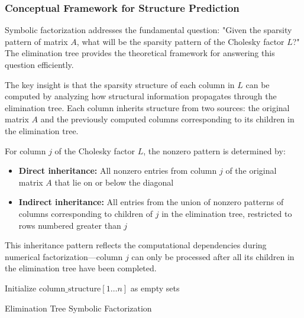 \subsubsection{Conceptual Framework for Structure Prediction}
Symbolic factorization addresses the fundamental question: "Given the sparsity pattern of matrix $A$, what will be the sparsity pattern of the Cholesky factor $L$?" The elimination tree provides the theoretical framework for answering this question efficiently.

The key insight is that the sparsity structure of each column in $L$ can be computed by analyzing how structural information propagates through the elimination tree. Each column inherits structure from two sources: the original matrix $A$ and the previously computed columns corresponding to its children in the elimination tree.

\begin{definition}
For column $j$ of the Cholesky factor $L$, the nonzero pattern is determined by:
\begin{itemize}
    \item \textbf{Direct inheritance:} All nonzero entries from column $j$ of the original matrix $A$ that lie on or below the diagonal
    \item \textbf{Indirect inheritance:} All entries from the union of nonzero patterns of columns corresponding to children of $j$ in the elimination tree, restricted to rows numbered greater than $j$
\end{itemize}
\end{definition}

This inheritance pattern reflects the computational dependencies during numerical factorization—column $j$ can only be processed after all its children in the elimination tree have been completed.

\begin{algorithm}
\BlankLine
Initialize $\text{column\_structure}[1 \ldots n]$ as empty sets\;
\caption{Elimination Tree Symbolic Factorization}
\label{alg:symbolic_factorization}
\end{algorithm}

